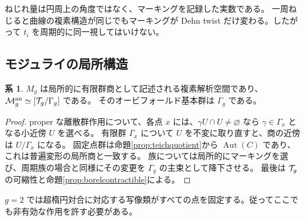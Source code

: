 \documentclass[dvipdfmx,a4paper,11pt]{article}
\theoremstyle{definition}
\newtheorem{cor}[thm]{系}
\DeclareMathOperator{\Aut}{Aut}\DeclareMathOperator{\Pic}{Pic}\DeclareMathOperator{\Hom}{Hom}
\begin{document}
\par\medskip
\noindent\begin{minipage}{\linewidth}
\begin{center}
\end{center}
ねじれ量は円周上の角度ではなく、マーキングを記録した実数である。
一周ねじると曲線の複素構造が同じでもマーキングが Dehn twist だけ変わる。したがって $t_i$ を周期的に同一視してはいけない。
\end{minipage}\par\medskip

\subsection{モジュライの局所構造}
\begin{cor}
$M_g$ は局所的に有限群商として記述される複素解析空間であり、
$\mathcal M_g^{\rm an}\simeq[\mathcal T_g/\Gamma_g]$ である。
そのオービフォールド基本群は $\Gamma_g$ である。
\end{cor}
\begin{proof}
proper な離散群作用について、各点 $x$ には、$\gamma U\cap U\neq\varnothing$ なら $\gamma\in\Gamma_x$ となる小近傍 $U$ を選べる。
有限群 $\Gamma_x$ について $U$ を不変に取り直すと、商の近傍は $U/\Gamma_x$ になる。
固定点群は命題\ref{prop:teichquotient}から $\Aut(C)$ であり、これは普遍変形の局所商と一致する。
族については局所的にマーキングを選び、周期族の場合と同様にその変更を $\Gamma_g$ の主束として降下させる。
最後は $\mathcal T_g$ の可縮性と命題\ref{prop:borelcontractible}による。
\end{proof}
$g=2$ では超楕円対合に対応する写像類がすべての点を固定する。従ってここでも非有効な作用を許す必要がある。

\par\bigskip\Needspace{.70\textheight}
\end{document}
